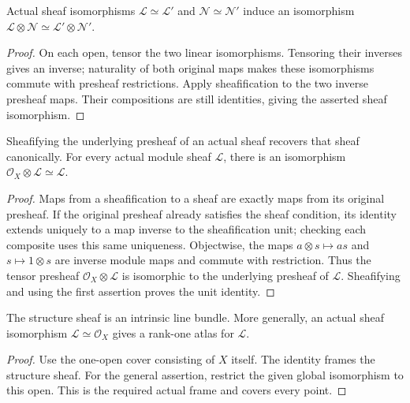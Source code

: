 \begin{lemma}
\label{sc0-canonical-port:geom:tensor-sheaf-isomorphisms}
\leanok
Actual sheaf isomorphisms \(\mathcal L\simeq\mathcal L'\)
and \(\mathcal N\simeq\mathcal N'\) induce an isomorphism
\(\mathcal L\otimes\mathcal N\simeq
\mathcal L'\otimes\mathcal N'\).
\end{lemma}
\begin{proof}
On each open, tensor the two linear isomorphisms. Tensoring their
inverses gives an inverse; naturality of both original maps makes
these isomorphisms commute with presheaf restrictions. Apply
sheafification to the two inverse presheaf maps. Their compositions
are still identities, giving the asserted sheaf isomorphism.
\end{proof}

\begin{lemma}
\label{sc0-canonical-port:geom:tensor-sheaf-unit}
\leanok
Sheafifying the underlying presheaf of an actual sheaf recovers
that sheaf canonically. For every actual module sheaf
\(\mathcal L\), there is an isomorphism
\(\mathcal O_X\otimes\mathcal L\simeq\mathcal L\).
\end{lemma}
\begin{proof}
Maps from a sheafification to a sheaf are exactly maps from its
original presheaf. If the original presheaf already satisfies the
sheaf condition, its identity extends uniquely to a map inverse
to the sheafification unit; checking each composite uses this
same uniqueness. Objectwise, the maps
\(a\otimes s\mapsto a s\) and \(s\mapsto1\otimes s\)
are inverse module maps and commute with restriction. Thus the
tensor presheaf \(\mathcal O_X\otimes\mathcal L\) is
isomorphic to the underlying presheaf of \(\mathcal L\).
Sheafifying and using the first assertion proves the unit identity.
\end{proof}

\begin{lemma}
\label{sc0-canonical-port:geom:global-frame-line-atlas}
\leanok
The structure sheaf is an intrinsic line bundle. More generally,
an actual sheaf isomorphism \(\mathcal L\simeq\mathcal O_X\)
gives a rank-one atlas for \(\mathcal L\).
\end{lemma}
\begin{proof}
Use the one-open cover consisting of \(X\) itself. The identity
frames the structure sheaf. For the general assertion, restrict
the given global isomorphism to this open. This is the required
actual frame and covers every point.
\end{proof}

